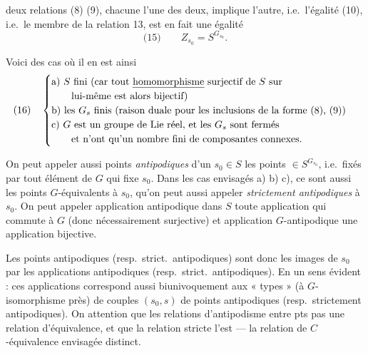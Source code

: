 \documentclass[11pt,a4paper]{article}
\begin{document}
deux relations (8) (9), chacune l'une des deux, implique l'autre, i.e.\ l'égalité (10),
i.e.\ le membre  de la relation 13, est en fait une égalité
\[
\text{(15)} \qquad Z_{s_0} = S^{G_{s_0}} .
\]

Voici des cas où il en est ainsi
\[
\text{(16)}\quad
\begin{cases}
\text{a) } S \text{ fini (car tout \uncertain{homomorphisme} surjectif de } S \text{ sur}\\
\qquad \text{lui-même est alors bijectif)}\\
\text{b) les } G_s \text{ finis (raison duale pour les inclusions de la forme (8), (9))}\\
\text{c) } G \text{ est un groupe de Lie réel, et les } G_s \text{ sont fermés}\\
\qquad \text{et n'ont qu'un nombre fini de composantes connexes.}
\end{cases}
\]

\struck{\ill{}} On peut appeler aussi points \emph{antipodiques}
 d'un $s_0 \in S$ les points $\in S^{G_{s_0}}$, i.e.\ fixés
par tout élément de $G$ qui fixe $s_0$. Dans les cas envisagés a) b) c), ce sont
aussi les points $G$-équivalents à $s_0$, qu'on peut aussi appeler
\emph{strictement antipodiques} à $s_0$. On peut appeler application
antipodique dans $S$ toute application qui commute à $G$ (donc
nécessairement surjective)  et  application
$G$-antipodique une application bijective.

Les points antipodiques (resp.\ strict.\ antipodiques) sont donc les images de
$s_0$ par les applications antipodiques (resp.\ strict.\ antipodiques). En un
sens évident :  ces applications correspond aussi
biunivoquement aux « types » (à $G$-isomorphisme près) de couples $(s_0, s)$ de
points antipodiques (resp.\ strictement antipodiques). On 
attention que les relations d'antipodisme entre pts  pas
 une relation d'équivalence, et  que la relation
stricte l'est —  la relation de $C$-équivalence envisagée
\ill{} distinct.
\end{document}
